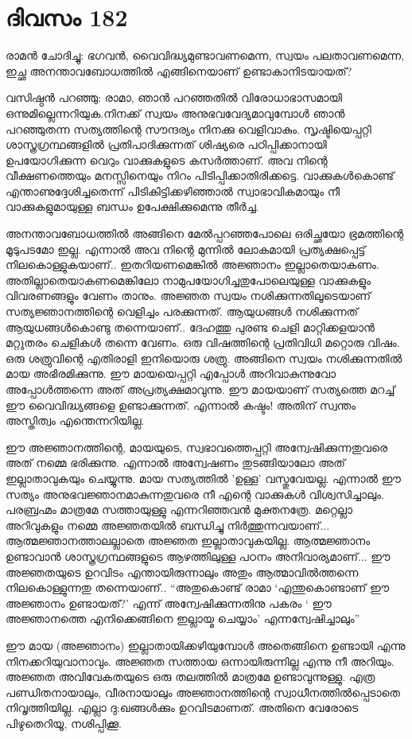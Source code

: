 \section{ദിവസം 182}


രാമൻ ചോദിച്ചു: ഭഗവൻ, വൈവിദ്ധ്യമുണ്ടാവണമെന്ന, സ്വയം പലതാവണമെന്ന, ഇച്ഛ അനന്താവബോധത്തിൽ എങ്ങിനെയാണ്‌ ഉണ്ടാകാനിടയായത്?

വസിഷ്ഠൻ പറഞ്ഞു: രാമാ, ഞാൻ പറഞ്ഞതിൽ വിരോധാഭാസമായി ഒന്നുമില്ലെന്നറിയുക.നിനക്ക് സ്വയം അനുഭവവേദ്യമാവുമ്പോള്‍ ഞാൻ പറഞ്ഞുതന്ന സത്യത്തിന്റെ സൗന്ദര്യം നിനക്കു വെളിവാകും. സൃഷ്ടിയെപ്പറ്റി ശാസ്ത്രഗ്രന്ഥങ്ങളിൽ പ്രതിപാദിക്കുന്നത് ശിഷ്യരെ പഠിപ്പിക്കാനായി ഉപയോഗിക്കുന്ന വെറും വാക്കുകളുടെ കസർത്താണ്‌. അവ നിന്റെ വീക്ഷണത്തെയും മനസ്സിനെയും നിറം പിടിപ്പിക്കാതിരിക്കട്ടെ. വാക്കുകൾകൊണ്ട് എന്താണുദ്ദേശിച്ചതെന്ന് പിടികിട്ടിക്കഴിഞ്ഞാൽ സ്വാഭാവികമായും നീ വാക്കുകളുമായുള്ള ബന്ധം ഉപേക്ഷിക്കുമെന്നു തീർച്ച.

അനന്താവബോധത്തിൽ അങ്ങിനെ മേൽപ്പറഞ്ഞപോലെ ഒരിച്ഛയോ ഭ്രമത്തിന്റെ മൂടുപടമോ ഇല്ല. എന്നാൽ അവ നിന്റെ മുന്നിൽ ലോകമായി പ്രത്യക്ഷപ്പെട്ട് നിലകൊള്ളുകയാണ്‌.. ഇതറിയണമെങ്കിൽ അജ്ഞാനം ഇല്ലാതെയാകണം. അതില്ലാതെയാകണമെങ്കിലോ നാമുപയോഗിച്ചതുപോലെയുള്ള വാക്കുകളും വിവരണങ്ങളും വേണം താനും. അജ്ഞത സ്വയം നശിക്കുന്നതിലൂടെയാണ്‌ സത്യജ്ഞാനത്തിന്റെ വെളിച്ചം പരക്കുന്നത്. ആയുധങ്ങൾ നശിക്കുന്നത് ആയുധങ്ങൾകൊണ്ടു തന്നെയാണ്‌.. ദേഹത്തു പുരണ്ട ചെളി മാറ്റിക്കളയാൻ മറ്റുതരം  ചെളികള്‍ തന്നെ വേണം. ഒരു വിഷത്തിന്റെ പ്രതിവിധി മറ്റൊരു വിഷം. ഒരു ശത്രുവിന്റെ എതിരാളി ഇനിയൊരു ശത്രു. അങ്ങിനെ സ്വയം നശിക്കുന്നതിൽ മായ അഭിരമിക്കുന്നു. ഈ മായയെപ്പറ്റി എപ്പോൾ അറിവാകുന്നുവോ അപ്പോൾത്തന്നെ അത് അപ്രത്യക്ഷമാവുന്നു. ഈ മായയാണ്‌ സത്യത്തെ മറച്ച് ഈ വൈവിദ്ധ്യങ്ങളെ ഉണ്ടാക്കുന്നത്. എന്നാൽ കഷ്ടം! അതിന്‌ സ്വന്തം അസ്തിത്വം എന്തെന്നറിയില്ല.

ഈ അജ്ഞാനത്തിന്റെ, മായയുടെ, സ്വഭാവത്തെപ്പറ്റി അന്വേഷിക്കുന്നതുവരെ അത് നമ്മെ ഭരിക്കുന്നു. എന്നാൽ അന്വേഷണം തുടങ്ങിയാലോ അത് ഇല്ലാതാവുകയും ചെയ്യുന്നു. മായ സത്യത്തിൽ 'ഉള്ള' വസ്തുവേയല്ല. എന്നാൽ ഈ സത്യം അനുഭവജ്ഞാനമാകുന്നതുവരെ നീ എന്റെ വാക്കുകൾ വിശ്വസിച്ചാലും. പരബ്രഹ്മം മാത്രമേ സത്തായുള്ളു എന്നറിഞ്ഞവൻ മുക്തനത്രേ. മറ്റെല്ലാ അറിവുകളും നമ്മെ അജ്ഞതയിൽ ബന്ധിച്ചു നിർത്തുന്നവയാണ്‌... ആത്മജ്ഞാനത്താലല്ലാതെ അജ്ഞത ഇല്ലാതാവുകയില്ല. ആത്മജ്ഞാനം ഉണ്ടാവാൻ ശാസ്ത്രഗ്രന്ഥങ്ങളുടെ ആഴത്തിലുള്ള പഠനം അനിവാര്യമാണ്‌... ഈ അജ്ഞതയുടെ ഉറവിടം എന്തായിരുന്നാലും അതും ആത്മാവിൽത്തന്നെ നിലകൊള്ളുന്നതു തന്നെയാണ്‌.. “അതുകൊണ്ട് രാമാ ‘എന്തുകൊണ്ടാണ്‌ ഈ അജ്ഞാനം ഉണ്ടായത്?’ എന്ന് അന്വേഷിക്കുന്നതിനു പകരം ‘ ഈ അജ്ഞാനത്തെ എനിക്കെങ്ങിനെ ഇല്ലായ്മ ചെയ്യാം’ എന്നന്വേഷിച്ചാലും”

ഈ മായ (അജ്ഞാനം) ഇല്ലാതായിക്കഴിയുമ്പോൾ അതെങ്ങിനെ ഉണ്ടായി എന്നു നിനക്കറിയുവാനാവും. അജ്ഞത സത്തായ ഒന്നായിരുന്നില്ല എന്നു നീ അറിയും. അജ്ഞത അവിവേകതയുടെ  ഒരു തലത്തിൽ മാത്രമേ ഉണ്ടാവുന്നുള്ളു. എത്ര പണ്ഡിതനായാലും, വീരനായാലും അജ്ഞാനത്തിന്റെ സ്വാധീനത്തിൽപ്പെടാതെ നിവൃത്തിയില്ല. എല്ലാ ദു:ഖങ്ങൾക്കും ഉറവിടമാണത്. അതിനെ വേരോടെ പിഴുതെറിയൂ, നശിപ്പിക്കൂ. 
